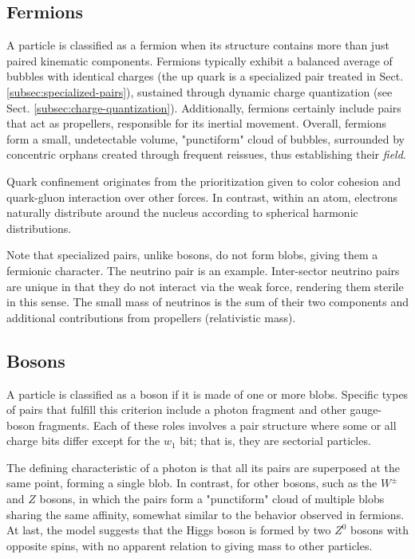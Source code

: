 \documentclass[12pt]{article}
\begin{document}
\subsection{Fermions}
A particle is classified as a fermion when its structure contains more than just paired kinematic components. Fermions typically exhibit a balanced average of bubbles with identical charges (the up quark is a specialized pair treated in Sect. \ref{subsec:specialized-pairs}), sustained through dynamic charge quantization (see Sect. \ref{subsec:charge-quantization}). Additionally, fermions certainly include pairs that act as propellers, responsible for its inertial movement. Overall, fermions form a small, undetectable volume, "punctiform" cloud of bubbles, surrounded by concentric orphans created through frequent reissues, thus establishing their \textit{field}.
 
Quark confinement originates from the prioritization given to color cohesion and quark-gluon interaction over other forces. In contrast, within an atom, electrons naturally distribute around the nucleus according to spherical harmonic distributions.

Note that specialized pairs, unlike bosons, do not form blobs, giving them a fermionic character. The neutrino pair is an example. Inter-sector neutrino pairs are unique in that they do not interact via the weak force, rendering them sterile in this sense. The small mass of neutrinos is the sum of their two components and additional contributions from propellers (relativistic mass).

\subsection{Bosons}\label{bosons}
A particle is classified as a boson if it is made of one or more blobs. Specific types of pairs that fulfill this criterion include a photon fragment and other gauge-boson fragments. Each of these roles involves a pair structure where some or all charge bits differ except for the $w_{1}$ bit; that is, they are sectorial particles. 

The defining characteristic of a photon is that all its pairs are superposed at the same point, forming a single blob. In contrast, for other bosons, such as the $W  ^{\pm}$ and $Z$ bosons, in which the pairs form a "punctiform" cloud of multiple blobs sharing the same affinity, somewhat similar to the behavior observed in fermions. At last, the model suggests that the Higgs boson is formed by two $Z^0$ bosons with opposite spins, with no apparent relation to giving mass to other particles.
\end{document}
